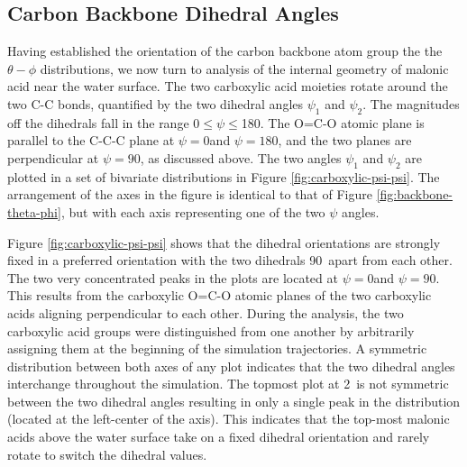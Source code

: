\subsection {Carbon Backbone Dihedral Angles}

Having established the orientation of the carbon backbone atom group the the $\theta-\phi$ distributions, we now turn to analysis of the  internal geometry of malonic acid near the water surface. The two carboxylic acid moieties rotate around the two C-C bonds, quantified by the two dihedral angles $\psi_1$ and $\psi_2$. The magnitudes off the dihedrals fall in the range 0\textdegree$\le \psi \le$180\textdegree. The O=C-O atomic plane is parallel to the C-C-C plane at $\psi=0$\textdegree and $\psi=180$\textdegree, and the two planes are perpendicular at $\psi=90$\textdegree, as discussed above. The two angles $\psi_1$ and $\psi_2$ are plotted in a set of bivariate distributions in Figure \ref{fig:carboxylic-psi-psi}. The arrangement of the axes in the figure is identical to that of Figure \ref{fig:backbone-theta-phi}, but with each axis representing one of the two $\psi$ angles.

Figure \ref{fig:carboxylic-psi-psi} shows that the dihedral orientations are strongly fixed in a preferred orientation with the two dihedrals 90\textdegree~apart from each other. The two very concentrated peaks in the plots are located at $\psi=0$\textdegree and $\psi=90$\textdegree. This results from the carboxylic O=C-O atomic planes of the two carboxylic acids aligning perpendicular to each other. During the analysis, the two carboxylic acid groups were distinguished from one another by arbitrarily assigning them at the beginning of the simulation trajectories. A symmetric distribution between both axes of any plot indicates that the two dihedral angles interchange throughout the simulation. The topmost plot at 2\angs~is not symmetric between the two dihedral angles resulting in only a single peak in the distribution (located at the left-center of the axis). This indicates that the top-most malonic acids above the water surface take on a fixed dihedral orientation and rarely rotate to switch the dihedral values.


